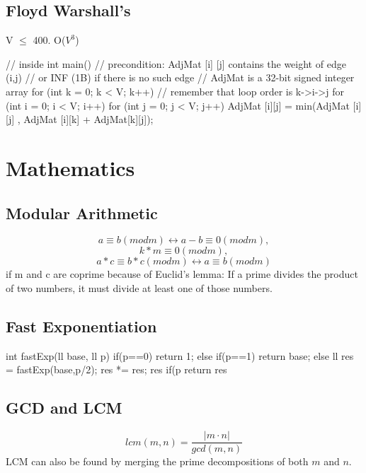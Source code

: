 \documentclass{article}
\begin{document}
\subsection{Floyd Warshall's}
V $\leq$ 400. O(\(V^3\))
\begin{mylisting}{}
// inside int main()
// precondition: AdjMat [i] [j] contains the weight of edge (i,j)  
// or INF (1B) if there is no such edge
// AdjMat is a 32-bit signed integer array
for (int k = 0; k < V; k++) // remember that loop order is k->i->j
	for (int i = 0; i < V; i++)
		for (int j = 0; j < V; j++)
			AdjMat [i][j] = min(AdjMat [i][j] , AdjMat [i][k] + AdjMat[k][j]);
\end{mylisting}


\section{Mathematics}
\subsection{Modular Arithmetic}
\[ a \equiv b (mod m) \leftrightarrow a - b \equiv 0 (mod m),\]
\[k * m \equiv 0 (mod m),\]
\[a * c \equiv b * c (mod m) \leftrightarrow a \equiv b (mod m)\]
if m and c are coprime because of Euclid’s lemma: If a prime divides the product of two numbers, it must divide at least one of those numbers.
\subsection{Fast Exponentiation}
\begin{mylisting}{}
int fastExp(ll base, ll p){
	if(p==0) return 1;
	else if(p==1) return base;
	else{
		ll res = fastExp(base,p/2);
		res *= res;
		res %
		if(p%
		return res%
		}
}
\end{mylisting}

\subsection{GCD and LCM}

\[lcm(m,n)=\frac{|m \cdot n|}{gcd(m,n)}\]
LCM can also be found by merging the prime decompositions of both \(m\) and \(n\). 
\end{document}

